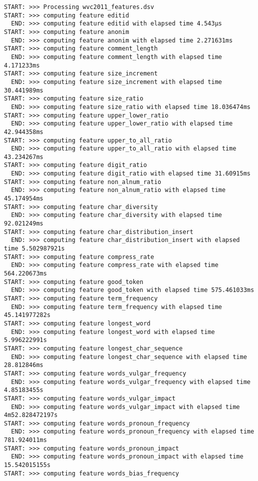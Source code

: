 \begin{lstlisting}[style=data,basicstyle=\tiny\ttfamily]
START: >>> Processing wvc2011_features.dsv
START: >>> computing feature editid
  END: >>> computing feature editid with elapsed time 4.543µs
START: >>> computing feature anonim
  END: >>> computing feature anonim with elapsed time 2.271631ms
START: >>> computing feature comment_length
  END: >>> computing feature comment_length with elapsed time 4.171233ms
START: >>> computing feature size_increment
  END: >>> computing feature size_increment with elapsed time 30.441989ms
START: >>> computing feature size_ratio
  END: >>> computing feature size_ratio with elapsed time 18.036474ms
START: >>> computing feature upper_lower_ratio
  END: >>> computing feature upper_lower_ratio with elapsed time 42.944358ms
START: >>> computing feature upper_to_all_ratio
  END: >>> computing feature upper_to_all_ratio with elapsed time 43.234267ms
START: >>> computing feature digit_ratio
  END: >>> computing feature digit_ratio with elapsed time 31.60915ms
START: >>> computing feature non_alnum_ratio
  END: >>> computing feature non_alnum_ratio with elapsed time 45.174954ms
START: >>> computing feature char_diversity
  END: >>> computing feature char_diversity with elapsed time 92.021249ms
START: >>> computing feature char_distribution_insert
  END: >>> computing feature char_distribution_insert with elapsed time 5.502987921s
START: >>> computing feature compress_rate
  END: >>> computing feature compress_rate with elapsed time 564.220673ms
START: >>> computing feature good_token
  END: >>> computing feature good_token with elapsed time 575.461033ms
START: >>> computing feature term_frequency
  END: >>> computing feature term_frequency with elapsed time 45.141977282s
START: >>> computing feature longest_word
  END: >>> computing feature longest_word with elapsed time 5.996222991s
START: >>> computing feature longest_char_sequence
  END: >>> computing feature longest_char_sequence with elapsed time 28.812846ms
START: >>> computing feature words_vulgar_frequency
  END: >>> computing feature words_vulgar_frequency with elapsed time 4.85183455s
START: >>> computing feature words_vulgar_impact
  END: >>> computing feature words_vulgar_impact with elapsed time 4m52.828472197s
START: >>> computing feature words_pronoun_frequency
  END: >>> computing feature words_pronoun_frequency with elapsed time 781.924011ms
START: >>> computing feature words_pronoun_impact
  END: >>> computing feature words_pronoun_impact with elapsed time 15.542015155s
START: >>> computing feature words_bias_frequency

\end{lstlisting}

